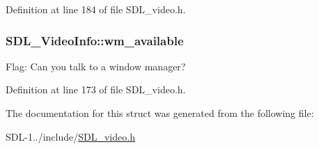 Definition at line 184 of file S\+D\+L\+\_\+video.\+h.

\hypertarget{struct_s_d_l___video_info_aa7dee6b91b73acd0476d67d7036669e9}{}
\subsubsection[{wm\+\_\+available}]{ S\+D\+L\+\_\+\+Video\+Info\+::wm\+\_\+available}\label{struct_s_d_l___video_info_aa7dee6b91b73acd0476d67d7036669e9}
Flag\+: Can you talk to a window manager? 

Definition at line 173 of file S\+D\+L\+\_\+video.\+h.



The documentation for this struct was generated from the following file\+:\begin{DoxyCompactItemize}
\item 
S\+D\+L-\/1../include/\hyperlink{_s_d_l__video_8h}{S\+D\+L\+\_\+video.\+h}\end{DoxyCompactItemize}
